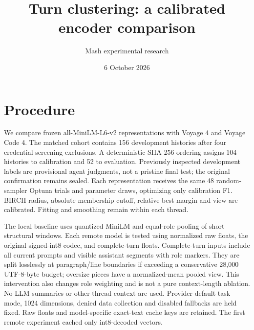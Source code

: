 \documentclass[11pt]{article}
\title{Turn clustering: a calibrated encoder comparison}
\author{Mash experimental research}
\date{6 October 2026}
\begin{document}
\maketitle
\section{Procedure}
We compare frozen all-MiniLM-L6-v2 representations with Voyage 4 and Voyage
Code 4. The matched cohort contains 156 development histories after four
credential-screening exclusions. A deterministic SHA-256 ordering assigns
104 histories to calibration and 52 to evaluation. Previously inspected
development labels are provisional agent judgments, not a pristine final test;
the original confirmation remains sealed. Each representation receives the
same 48 random-sampler Optuna trials and parameter draws, optimizing only
calibration F1. BIRCH radius, absolute membership cutoff, relative-best margin
and view are calibrated. Fitting and smoothing remain within each thread.

The local baseline uses quantized MiniLM and equal-role pooling of short
structural windows. Each remote model is tested using normalized raw floats,
the original signed-int8 codec, and complete-turn floats. Complete-turn inputs
include all current prompts and visible assistant segments with role markers.
They are split losslessly at paragraph/line boundaries if exceeding a
conservative 28,000 UTF-8-byte budget; oversize pieces have a normalized-mean
pooled view. This intervention also changes role weighting and is not a pure
context-length ablation. No LLM summaries or other-thread context are used.
Provider-default task mode, 1024 dimensions, denied data collection and disabled
fallbacks are held fixed. Raw floats and model-specific exact-text cache keys
are retained. The first remote experiment cached only int8-decoded vectors.
\end{document}
